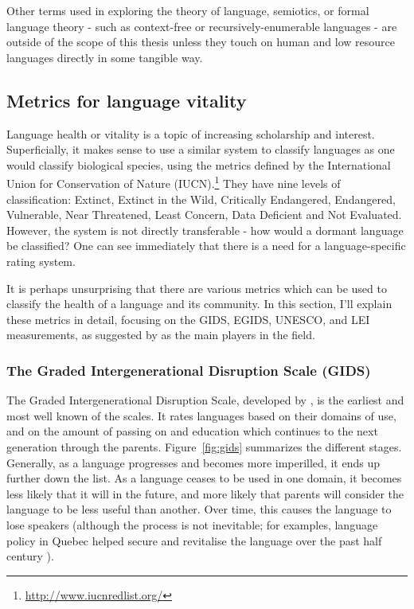 Other terms used in exploring the theory of language, semiotics, or formal language theory - such as context-free or recursively-enumerable languages - are outside of the scope of this thesis unless they touch on human and low resource languages directly in some tangible way.

\subsection{Metrics for language vitality}
\label{subsec:metrics}

Language health or vitality is a topic of increasing scholarship and interest. Superficially, it makes sense to use a similar system to classify languages as one would classify biological species, using the metrics defined by the International Union for Conservation of Nature (IUCN).\footnote{\href{http://www.iucnredlist.org/}{http://www.iucnredlist.org/}} They have nine levels of classification: Extinct, Extinct in the Wild, Critically Endangered, Endangered, Vulnerable, Near Threatened, Least Concern, Data Deficient and Not Evaluated. However, the system is not directly transferable - how would a dormant language be classified? One can see immediately that there is a need for a language-specific rating system.

It is perhaps unsurprising that there are various metrics which can be used to classify the health of a language and its community. In this section, I'll explain these metrics in detail, focusing on the GIDS, EGIDS, UNESCO, and LEI measurements, as suggested by \citet{yang2017toward} as the main players in the field.

\subsubsection{The Graded Intergenerational Disruption Scale (GIDS)}

The Graded Intergenerational Disruption Scale, developed by \citet{fishman1991reversing}, is the earliest and most well known of the scales. It rates languages based on their domains of use, and on the amount of passing on and education which continues to the next generation through the parents. Figure~\ref{fig:gids} summarizes the different stages. Generally, as a language progresses and becomes more imperilled, it ends up further down the list. As a language ceases to be used in one domain, it becomes less likely that it will in the future, and more likely that parents will consider the language to be less useful than another. Over time, this causes the language to lose speakers (although the process is not inevitable; for examples, language policy in Quebec helped secure and revitalise the language over the past half century \citep{bourhis2001reversing}).

